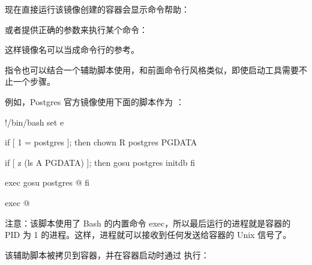 \documentclass[letterpaper,10pt,english]{sphinxmanual}
\begin{document}
\begin{sphinxVerbatim}[commandchars=\\\{\}]
 \PYG{p}{[}\PYG{p}{]}

 \PYG{p}{[}\PYG{p}{]}
\end{sphinxVerbatim}

现在直接运行该镜像创建的容器会显示命令帮助：

或者提供正确的参数来执行某个命令：

这样镜像名可以当成命令行的参考。

 指令也可以结合一个辅助脚本使用，和前面命令行风格类似，即使启动工具需要不止一个步骤。

例如，Postgres 官方镜像使用下面的脚本作为 ：

\begin{sphinxVerbatim}[commandchars=\\\{\}]
\PYGZsh{}!/bin/bash
set \PYGZhy{}e

if [ \PYGZdq{}\PYGZdl{}1\PYGZdq{} = \PYGZsq{}postgres\PYGZsq{} ]; then
    chown \PYGZhy{}R postgres \PYGZdq{}\PYGZdl{}PGDATA\PYGZdq{}

    if [ \PYGZhy{}z \PYGZdq{}\PYGZdl{}(ls \PYGZhy{}A \PYGZdq{}\PYGZdl{}PGDATA\PYGZdq{})\PYGZdq{} ]; then
        gosu postgres initdb
    fi

    exec gosu postgres \PYGZdq{}\PYGZdl{}@\PYGZdq{}
fi

exec \PYGZdq{}\PYGZdl{}@\PYGZdq{}
\end{sphinxVerbatim}

注意：该脚本使用了 Bash 的内置命令 exec，所以最后运行的进程就是容器的 PID 为 1 的进程。这样，进程就可以接收到任何发送给容器的 Unix 信号了。

该辅助脚本被拷贝到容器，并在容器启动时通过  执行：

\begin{sphinxVerbatim}[commandchars=\\\{\}]
  

 \PYG{p}{[}\PYG{p}{]}
\end{sphinxVerbatim}
\end{document}
